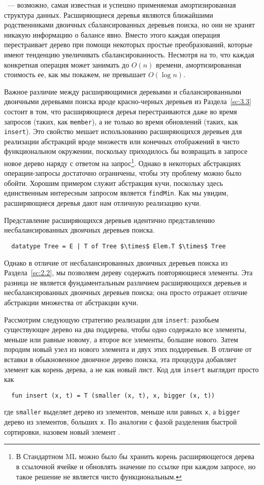  \cite{SleatorTarjan85}~--- возможно, самая известная
и успешно применяемая амортизированная структура данных. Расширяющиеся
деревья являются ближайшими родственниками двоичных сбалансированных
деревьев поиска, но они не хранят никакую информацию о балансе
явно. Вместо этого каждая операция перестраивает дерево при помощи
некоторых простые преобразований, которые имеют тенденцию увеличивать
сбалансированность. Несмотря на то, что каждая конкретная операция
может занимать до $O(n)$ времени, амортизированная стоимость ее, как
мы покажем, не превышает $O(\log n)$.

Важное различие между расширяющимися деревьями и сбалансированными
двоичными деревьями поиска вроде красно-черных деревьев из
Раздела~\ref{sc:3.3} состоит в том, что расширяющиеся дереья
перестраиваются даже во время запросов (таких, как \lstinline!member!),
а не только во время обновлений (таких, как \lstinline!insert!). Это
свойство мешает использованию расширяющихся деревьев для реализации
абстракций вроде множеств или конечных отображений в чисто
функциональном окружении, поскольку приходилось бы возвращать в
запросе новое дерево наряду с ответом на запрос\footnote{%
В Стандартном ML можно было бы хранить корень расширяющегося дерева в
ссылочной ячейке и обновлять значение по ссылке при каждом запросе, но
такое решение не является чисто функциональным.
}.
Однако в некоторых абстракциях операции-запросы достаточно ограничены,
чтобы эту проблему можно было обойти. Хорошим примером служит
абстракция кучи, поскольку здесь единственным интересным запросом
является \lstinline!findMin!. Как мы увидим, расширяющиеся деревья дают
нам отличную реализацию кучи.

Представление расширяющихся деревьев идентично представлению
несбалансированных двоичных деревьев поиска.
\begin{lstlisting}
  datatype Tree = E | T of Tree $\times$ Elem.T $\times$ Tree
\end{lstlisting}
Однако в отличие от несбалансированных двоичных деревьев поиска из
Раздела~\ref{sc:2.2}, мы позволяем дереву содержать повторяющиеся
элементы. Эта разница не является фундаментальным различием расширяющихся
деревьев и несбалансированных двоичных деревьев поиска; она просто
отражает отличие абстракции множества от абстракции кучи.

Рассмотрим следующую стратегию реализации для \lstinline!insert!:
разобьем существующее дерево на два поддерева, чтобы одно содержало все
элементы, меньше или равные новому, а второе все элементы, большие
нового. Затем породим новый узел из нового элемента и двух этих
поддеревьев. В отличие от вставки в обыкновенное двоичное дерево
поиска, эта процедура добавляет элемент как корень дерева, а не как
новый лист. Код для \lstinline!insert! выглядит просто как
\begin{lstlisting}
  fun insert (x, t) = T (smaller (x, t), x, bigger (x, t))
\end{lstlisting}
где \lstinline!smaller! выделяет дерево из элементов, меньше или равных
\lstinline!x!, а \lstinline!bigger! дерево из элементов, больших
\lstinline!x!. По аналогии с фазой разделения быстрой сортировки,
назовем новый элемент .

